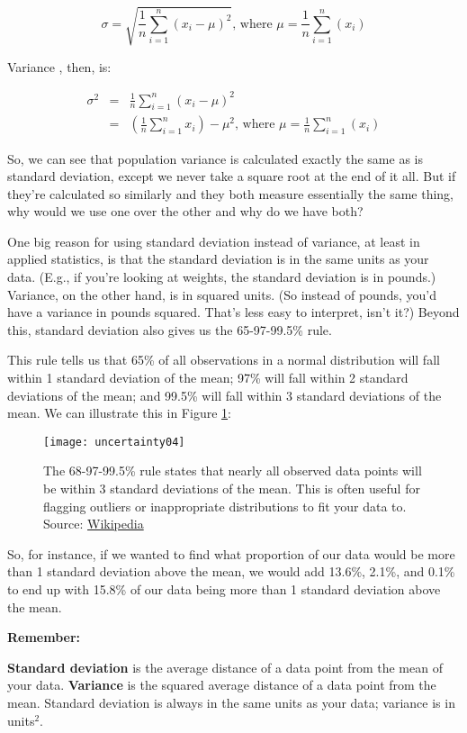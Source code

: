     \[ \sigma = \sqrt{\frac{1}{n}\sum_{i=1}^n\left(x_i-\mu\right)^2}\text{, where } \mu=\frac{1}{n}\sum_{i=1}^n(x_i) \]

Variance , then, is:

\begin{eqnarray*}
	\sigma^2 &=& \frac{1}{n}\sum_{i=1}^n\left(x_i-\mu\right)^2 \\
	&=& \left(\frac{1}{n}\sum_{i=1}^nx_i\right)-\mu^2\text{, where } \mu=\frac{1}{n}\sum_{i=1}^n(x_i)
\end{eqnarray*}

So, we can see that population variance is calculated exactly the same as is standard deviation, except we never take a square root at the end of it all. But if they're calculated so similarly and they both measure essentially the same thing, why would we use one over the other and why do we have both?

One big reason for using standard deviation instead of variance, at least in applied statistics, is that the standard deviation is in the same units as your data. (E.g., if you're looking at weights, the standard deviation is in pounds.) Variance, on the other hand, is in squared units. (So instead of pounds, you'd have a variance in pounds squared. That's less easy to interpret, isn't it?) Beyond this, standard deviation also gives us the 65-97-99.5\% rule.

This rule tells us that 65\% of all observations in a normal distribution will fall within 1 standard deviation of the mean; 97\% will fall within 2 standard deviations of the mean; and 99.5\% will fall within 3 standard deviations of the mean. We can illustrate this in Figure \ref{fig:uncertainty04}:

\begin{figure}[h!]
\texttt{[image: uncertainty04]}
\caption{The 68-97-99.5\% rule states that nearly all observed data points will be within 3 standard deviations of the mean. This is often useful for flagging outliers or inappropriate distributions to fit your data to. Source: \href{http://en.wikipedia.org/wiki/Standard_deviation}{Wikipedia}}
\label{fig:uncertainty04}
\end{figure}

So, for instance, if we wanted to find what proportion of our data would be more than 1 standard deviation above the mean, we would add 13.6\%, 2.1\%, and 0.1\% to end up with 15.8\% of our data being more than 1 standard deviation above the mean.

\begin{framed}
\noindent \textbf{{\large Remember:}}

\textbf{Standard deviation} is the average distance of a data point from the mean of your data. \textbf{Variance} is the squared average distance of a data point from the mean. Standard deviation is always in the same units as your data; variance is in units\(^2\).
\end{framed}

